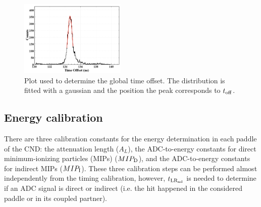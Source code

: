 \begin{figure}[htb]
\begin{center}
\includegraphics[width=0.45\textwidth]{Figure/timeoff.png} 
\end{center}
\caption{Plot used to determine the global time offset. The distribution is fitted with a gaussian and the position the peak corresponds to $t_{\rm{off}}$.}
\label{toff}
\end{figure}

\subsection{Energy calibration}

There are three calibration constants for the energy determination in each paddle of the CND: the attenuation length ($A_{L}$), the ADC-to-energy constants for direct minimum-ionizing particles (MIPs) ($MIP_{\rm{D}}$), and the ADC-to-energy constants for indirect MIPs ($MIP_{\rm{I}}$).
These three calibration steps can be performed almost independently from the timing calibration, however, $t_{\rm{LR_{\rm{ad}}}}$ is needed to determine if an ADC signal is direct or indirect (i.e. the hit happened in the considered paddle or in its coupled partner).

